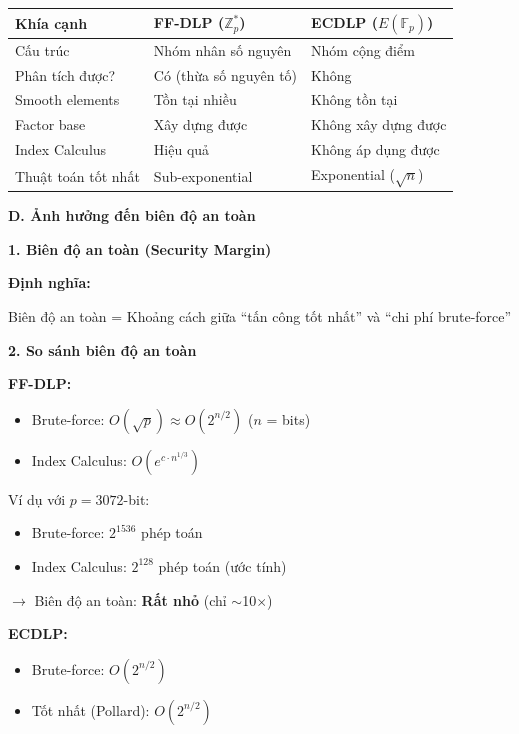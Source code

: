 \begin{center}
\begin{tabular}{|p{3.5cm}|p{4cm}|p{4cm}|}
\hline
\textbf{Khía cạnh} & \textbf{FF-DLP ($\mathbb{Z}_p^*$)} & \textbf{ECDLP ($E(\mathbb{F}_p)$)} \\
\hline
Cấu trúc & Nhóm nhân số nguyên & Nhóm cộng điểm \\
Phân tích được? & Có (thừa số nguyên tố) & Không \\
Smooth elements & Tồn tại nhiều & Không tồn tại \\
Factor base & Xây dựng được & Không xây dựng được \\
Index Calculus & Hiệu quả & Không áp dụng được \\
Thuật toán tốt nhất & Sub-exponential & Exponential ($\sqrt{n}$) \\
\hline
\end{tabular}
\end{center}

\textbf{D. Ảnh hưởng đến biên độ an toàn}

\textbf{1. Biên độ an toàn (Security Margin)}

\textbf{Định nghĩa:}

Biên độ an toàn = Khoảng cách giữa ``tấn công tốt nhất'' và ``chi phí brute-force''

\textbf{2. So sánh biên độ an toàn}

\textbf{FF-DLP:}
\begin{itemize}
    \item Brute-force: $O(\sqrt{p}) \approx O(2^{n/2})$ ($n$ = bits)
    \item Index Calculus: $O(e^{c \cdot n^{1/3}})$
\end{itemize}

Ví dụ với $p = 3072$-bit:
\begin{itemize}
    \item Brute-force: $2^{1536}$ phép toán
    \item Index Calculus: $2^{128}$ phép toán (ước tính)
\end{itemize}

$\rightarrow$ Biên độ an toàn: \textbf{Rất nhỏ} (chỉ $\sim$10$\times$)

\textbf{ECDLP:}
\begin{itemize}
    \item Brute-force: $O(2^{n/2})$
    \item Tốt nhất (Pollard): $O(2^{n/2})$
\end{itemize}


